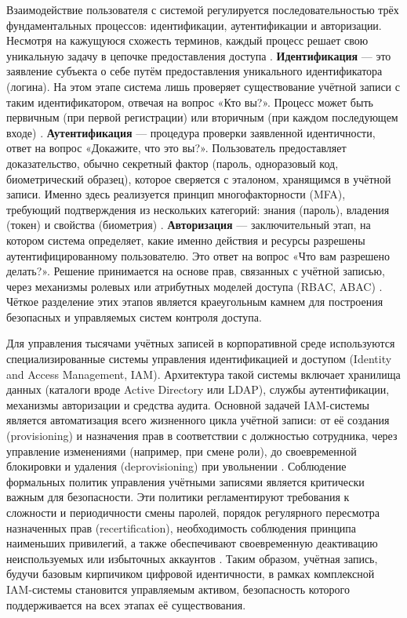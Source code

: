 \documentclass{SibFU-docs}
\begin{document}
Взаимодействие пользователя с системой регулируется последовательностью трёх фундаментальных процессов: идентификации, аутентификации и авторизации. Несмотря на кажущуюся схожесть терминов, каждый процесс решает свою уникальную задачу в цепочке предоставления доступа \cite{yandex_practicum_2025_ident_auth}. \textbf{Идентификация} — это заявление субъекта о себе путём предоставления уникального идентификатора (логина). На этом этапе система лишь проверяет существование учётной записи с таким идентификатором, отвечая на вопрос «Кто вы?». Процесс может быть первичным (при первой регистрации) или вторичным (при каждом последующем входе) \cite{rtsolar_2025_identifikacija}. \textbf{Аутентификация} — процедура проверки заявленной идентичности, ответ на вопрос «Докажите, что это вы?». Пользователь предоставляет доказательство, обычно секретный фактор (пароль, одноразовый код, биометрический образец), которое сверяется с эталоном, хранящимся в учётной записи. Именно здесь реализуется принцип многофакторности (MFA), требующий подтверждения из нескольких категорий: знания (пароль), владения (токен) и свойства (биометрия) \cite{rtsolar_2025_avtorizacija}. \textbf{Авторизация} — заключительный этап, на котором система определяет, какие именно действия и ресурсы разрешены аутентифицированному пользователю. Это ответ на вопрос «Что вам разрешено делать?». Решение принимается на основе прав, связанных с учётной записью, через механизмы ролевых или атрибутных моделей доступа (RBAC, ABAC) \cite{yandex_practicum_2025_ident_auth}. Чёткое разделение этих этапов является краеугольным камнем для построения безопасных и управляемых систем контроля доступа.

\newpage
{}

Для управления тысячами учётных записей в корпоративной среде используются специализированные системы управления идентификацией и доступом (Identity and Access Management, IAM). Архитектура такой системы включает хранилища данных (каталоги вроде Active Directory или LDAP), службы аутентификации, механизмы авторизации и средства аудита. Основной задачей IAM-системы является автоматизация всего жизненного цикла учётной записи: от её создания (provisioning) и назначения прав в соответствии с должностью сотрудника, через управление изменениями (например, при смене роли), до своевременной блокировки и удаления (deprovisioning) при увольнении \cite{identity_blitz_2025_policies}. Соблюдение формальных политик управления учётными записями является критически важным для безопасности. Эти политики регламентируют требования к сложности и периодичности смены паролей, порядок регулярного пересмотра назначенных прав (recertification), необходимость соблюдения принципа наименьших привилегий, а также обеспечивают своевременную деактивацию неиспользуемых или избыточных аккаунтов \cite{keepersecurity_2025_service_accounts}. Таким образом, учётная запись, будучи базовым кирпичиком цифровой идентичности, в рамках комплексной IAM-системы становится управляемым активом, безопасность которого поддерживается на всех этапах её существования.
\end{document}
